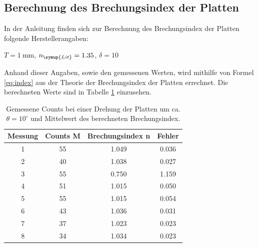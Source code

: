 \subsection{Berechnung des Brechungsindex der Platten}
  In der Anleitung \cite{Anleitung} finden sich zur Berechnung des Brechungsindex der Platten folgende Herstellerangaben:\\
\begin{center}
  $T = \SI{1}{\milli\meter}$, $n_{\symup{Lit}}=1.35$, $\delta =10$\circ
\end{center}
Anhand dieser Angaben, sowie den gemessenen Werten, wird mithilfe von Formel \eqref{eq:index} aus der Theorie der Brechungsindex der Platten errechnet.
Die berechneten Werte sind in Tabelle \ref{tab:plattenindex} einzusehen.\\
\begin{table}[H]
  \center
  \caption{Gemessene Counts bei einer Drehung der Platten um ca. $\theta=10^\circ$ und Mittelwert des berechneten Brechungsindex.}
	\label{tab:plattenindex}
  \begin{tabular}{c|c|c|c}
    Messung& Counts M& Brechungsindex n& Fehler\\
    \hline
    1& 55& 1.049& 0.036\\
    2& 40& 1.038& 0.027\\
    3& 55& 0.750& 1.159\\%
    4& 51& 1.015& 0.050\\
    5& 55& 1.015& 0.054\\
    6& 43& 1.036& 0.031\\
    7& 37& 1.023& 0.023\\
    8& 34& 1.034& 0.023\\
  \end{tabular}
\end{table}
